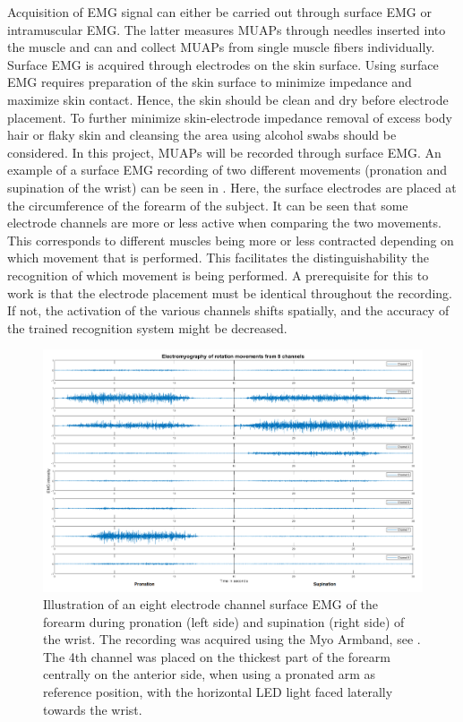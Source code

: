 Acquisition of EMG signal can either be carried out through surface EMG or intramuscular EMG. The latter measures MUAPs through needles inserted into the muscle and can and collect MUAPs from single muscle fibers individually. Surface EMG is acquired through electrodes on the skin surface. \cite{Cram2012}  Using surface EMG requires preparation of the skin surface to minimize impedance and maximize skin contact. Hence, the skin should be clean and dry before electrode placement. To further minimize skin-electrode impedance removal of excess body hair or flaky skin and cleansing the area using alcohol swabs should be considered. \cite{Turker2013,Cram2012} In this project, MUAPs will be recorded through surface EMG. An example of a surface EMG recording of two different movements (pronation and supination of the wrist) can be seen in . Here, the surface electrodes are placed at the circumference of the forearm of the subject. It can be seen that some electrode channels are more or less active when comparing the two movements. This corresponds to different muscles being more or less contracted depending on which movement that is performed. This facilitates the distinguishability the recognition of which movement is being performed. A prerequisite for this to work is that the electrode placement must be identical throughout the recording. If not, the activation of the various channels shifts spatially, and the accuracy of the trained recognition system might be decreased.

\begin{figure}[H]                 
	\includegraphics[width=1\textwidth]{figures/Emg_rot}  
	\caption{Illustration of an eight electrode channel surface EMG of the forearm during pronation (left side) and supination (right side) of the wrist. The recording was acquired using the Myo Armband, see . The 4th channel was placed on the thickest part of the forearm centrally on the anterior side, when using a pronated arm as reference position, with the horizontal LED light faced laterally towards the wrist.}
	\label{fig:Emg_rot} 
\end{figure}

